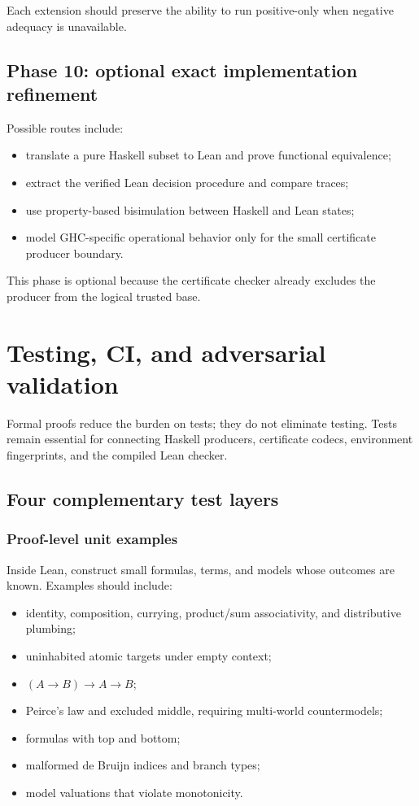 \documentclass[11pt,letterpaper,openany]{report}
\theoremstyle{definition}
\theoremstyle{remark}
\begin{document}
Each extension should preserve the ability to run positive-only when negative adequacy is unavailable.

\section{Phase 10: optional exact implementation refinement}

Possible routes include:

\begin{itemize}
\item translate a pure Haskell subset to Lean and prove functional equivalence;
\item extract the verified Lean decision procedure and compare traces;
\item use property-based bisimulation between Haskell and Lean states;
\item model GHC-specific operational behavior only for the small certificate producer boundary.
\end{itemize}

This phase is optional because the certificate checker already excludes the producer from the logical trusted base.

\chapter{Testing, CI, and adversarial validation}
\label{ch:testing}

Formal proofs reduce the burden on tests; they do not eliminate testing. Tests remain essential for connecting Haskell producers, certificate codecs, environment fingerprints, and the compiled Lean checker.

\section{Four complementary test layers}

\subsection{Proof-level unit examples}

Inside Lean, construct small formulas, terms, and models whose outcomes are known. Examples should include:

\begin{itemize}
\item identity, composition, currying, product/sum associativity, and distributive plumbing;
\item uninhabited atomic targets under empty context;
\item \((A\to B)\to A\to B\);
\item Peirce's law and excluded middle, requiring multi-world countermodels;
\item formulas with top and bottom;
\item malformed de Bruijn indices and branch types;
\item model valuations that violate monotonicity.
\end{itemize}
\end{document}
